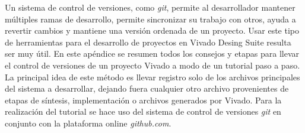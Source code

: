 Un sistema de control de versiones, como \textit{git}, permite al desarrollador mantener múltiples ramas de desarrollo, permite sincronizar su trabajo con otros, ayuda a revertir cambios y mantiene una versión ordenada de un proyecto. Usar este tipo de herramientas para el desarrollo de proyectos en Vivado Desing Suite resulta ser muy útil. En este apéndice se resumen todos los consejos y etapas para llevar el control de versiones de un proyecto Vivado a modo de un tutorial paso a paso. La principal idea de este método es llevar registro solo de los archivos principales del sistema a desarrollar, dejando fuera cualquier otro archivo provenientes de etapas de síntesis, implementación o archivos generados por Vivado. Para la realización del tutorial se hace uso del sistema de control de versiones \textit{git} en conjunto con la plataforma online \textit{github.com}.

